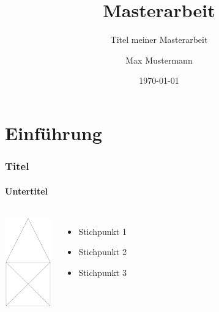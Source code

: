 \documentclass{beamer}
\title{Masterarbeit}
\subtitle{Titel meiner Masterarbeit}
\author{Max Mustermann}
\date{\today}
\institute{Hochschule Musterstadt}
\begin{document}
	
\section{Einführung}

\begin{frame}
\frametitle{Titel}
\framesubtitle{Untertitel}

\begin{columns}
	\centering
	\includegraphics[width=2cm]{house.png}
	\begin{itemize}
		\item Stichpunkt 1
		\item Stichpunkt 2
		\item Stichpunkt 3
	\end{itemize}
\end{columns}

\end{frame}
\end{document}
